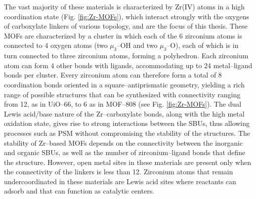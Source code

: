 The vast majority of these materials is characterized by Zr(IV) atoms in a high coordination state (Fig. \ref{fig:Zr-MOFs}), which interact strongly with the oxygens of carboxylate linkers of various topology, and are the focus of this thesis. These MOFs are characterized by a  cluster in which each of the 6 zirconium atoms is connected to 4 oxygen atoms (two $\mu_3$--OH and two $\mu_3$--O), each of which is in turn connected to three zirconium atoms, forming a polyhedron. Each zirconium atom can form 4 other bonds with ligands, accommodating up to 24 metal--ligand bonds per cluster. Every zirconium atom can therefore form a total of 8 coordination bonds oriented in a square--antiprismatic geometry, yielding a rich range of possible structures that can be synthesized with connectivity ranging from 12, as in UiO--66\cite{cavka2008new}, to 6 as in MOF--808\cite{furukawa2014water} (see Fig. \ref{fig:Zr-MOFs}). The dual Lewis acid/base nature of the Zr--carboxylate bonds, along with the high metal oxidation state, gives rise to strong interactions between the SBUs, thus allowing processes such as PSM without compromising the stability of the structures. The stability of Zr--based MOFs depends on the connectivity between the inorganic and organic SBUs, as well as the number of zirconium--ligand bonds that define the structure\cite{bai2016zr}. However, open metal sites in these materials are present only when the connectivity of the linkers is less than 12. Zirconium atoms that remain undercoordinated in these materials are Lewis acid sites where reactants can adsorb and that can function as catalytic centers.


